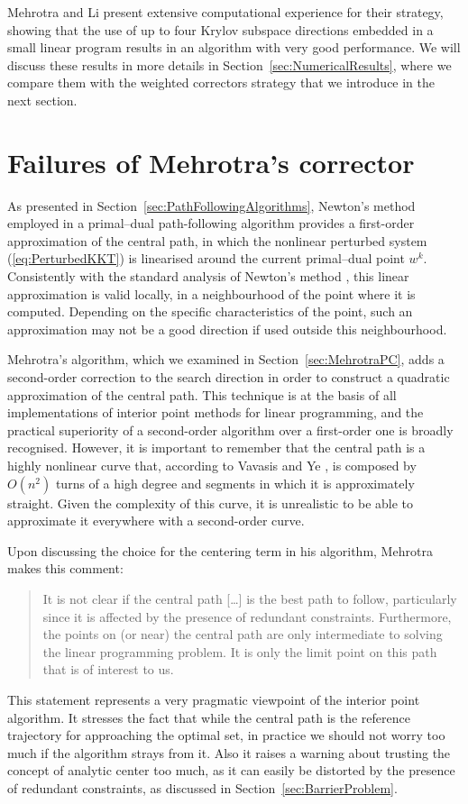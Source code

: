 Mehrotra and Li \cite{MehrotraLi} present extensive
computational experience for their strategy, showing that 
the use of up to four Krylov subspace directions embedded in a small
linear program results in an algorithm with very good performance.
We will discuss these results in more details in 
Section~\ref{sec:NumericalResults}, where we compare them with
the weighted correctors strategy that we introduce in the
next section.


%
%
\section{Failures of Mehrotra's corrector}

As presented in Section~\ref{sec:PathFollowingAlgorithms},
Newton's method employed in a primal--dual path-following algorithm
provides a first-order approximation of the central path, in which
the nonlinear perturbed \KKT system (\ref{eq:PerturbedKKT}) 
is linearised around the current primal--dual point $w^k$. Consistently with 
the standard analysis of Newton's method \cite{Fletcher},
this linear approximation 
is valid locally, in a neighbourhood of the point where 
it is computed. Depending on the specific characteristics of the point, 
such an approximation may not be a good direction
if used outside this neighbourhood.

Mehrotra's algorithm, which we examined in 
Section~\ref{sec:MehrotraPC}, adds a second-order correction to the search 
direction in order to construct a quadratic approximation 
of the central path. This technique is at the basis of all
implementations of interior point methods for linear programming,
and the practical superiority of a second-order algorithm over 
a first-order one is broadly recognised.
However, it is important to remember that 
the central path is a highly nonlinear curve that, according 
to Vavasis and Ye \cite{VavasisYe}, is composed by $O(n^2)$ turns 
of a high degree and segments in which it is approximately straight. 
Given the complexity of this curve, it is unrealistic to be able 
to approximate it everywhere with a second-order curve.

Upon discussing the choice for the centering term in his algorithm,
Mehrotra \cite{Mehrotra92} makes this comment:
\begin{quotation}
It is not clear if the central path [\ldots]
is the best path to follow, particularly since it
is affected by the presence of redundant constraints. Furthermore,
the points on (or near) the central path are only intermediate to
solving the linear programming problem. It is only the limit point 
on this path that is of interest to us.
\end{quotation}
This statement represents a very pragmatic viewpoint of the interior
point algorithm. It stresses the fact that while the central path
is the reference trajectory for approaching the optimal set,
in practice we should not worry too much if the algorithm strays from it.
Also it raises a warning about trusting the concept
of analytic center too much, as it can easily be distorted by the presence
of redundant constraints, as discussed in Section~\ref{sec:BarrierProblem}.

